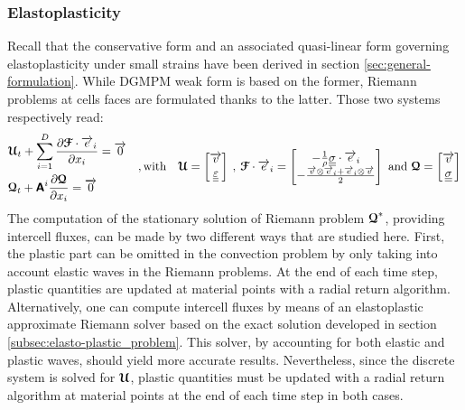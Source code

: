 \subsubsection{Elastoplasticity}
Recall that the conservative form and an associated quasi-linear form governing elastoplasticity under small strains have been derived in section \ref{sec:general-formulation}.
While DGMPM weak form is based on the former, Riemann problems at cells faces are formulated thanks to the latter. Those two systems respectively read:
\begin{equation*}
  \begin{aligned}
  & {\boldsymbol{\mathcal{U}}}_t + \sum_{i=1}^D \frac{\partial {\boldsymbol{\mathcal{F}}}\cdot {\overrightarrow{e}}_i}{\partial x_i} = {\overrightarrow{0}} \\
  & {\boldsymbol{\mathcal{Q}}}_t + \boldsymbol{\mathsf{A}}^i \frac{\partial {\boldsymbol{\mathcal{Q}}}}{\partial x_i} = {\overrightarrow{0}}
  \end{aligned} \quad,\text{with}\quad {\boldsymbol{\mathcal{U}}} =\left[\begin{matrix}{\overrightarrow{v}} \\ {\underline{\underline{\varepsilon}}}\end{matrix}\right] \:,\: {\boldsymbol{\mathcal{F}}}\cdot{\overrightarrow{e}}_i = \left[\begin{matrix}-\frac{1}{\rho}{\underline{\underline{\sigma}}}\cdot{\overrightarrow{e}}_i\\-\frac{{\overrightarrow{v}}\otimes{\overrightarrow{e}}_i +{\overrightarrow{e}}_i \otimes{\overrightarrow{v}} }{2} \end{matrix}\right] \text{ and } {\boldsymbol{\mathcal{Q}}}=\left[\begin{matrix}{\overrightarrow{v}}\\ {\underline{\underline{\sigma}}}\end{matrix}\right]
\end{equation*}
The computation of the stationary solution of Riemann problem ${\boldsymbol{\mathcal{Q}}}^*$, providing intercell fluxes, can be made by two different ways that are studied here.
First, the plastic part can be omitted in the convection problem by only taking into account elastic waves in the Riemann problems. At the end of each time step, plastic quantities are updated at material points with a radial return algorithm. %
Alternatively, one can compute intercell fluxes by means of an elastoplastic approximate Riemann solver based on the exact solution developed in section \ref{subsec:elasto-plastic_problem}. This solver, by accounting for both elastic and plastic waves, should yield more accurate results.
Nevertheless, since the discrete system is solved for ${\boldsymbol{\mathcal{U}}}$, plastic quantities must be updated with a radial return algorithm at material points at the end of each time step in both cases.

